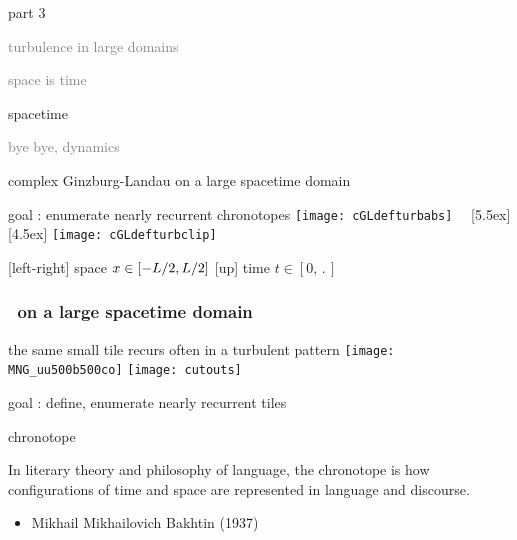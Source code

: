 \begin{frame}{part 3}
\begin{enumerate}
              \item
    \textcolor{gray}{\small
turbulence in large domains
              \item
space is time
    }
              \item {\Large
spacetime
    }\textcolor{gray}{\small
              \item
bye bye, dynamics
                    }
            \end{enumerate}
\end{frame}

\begin{frame}{complex Ginzburg-Landau on a large spacetime domain}
\begin{block}{goal : enumerate nearly recurrent chronotopes}
  \texttt{[image: cGLdefturbabs]}%
~~\raisebox{+3.33ex}[5.5ex][4.5ex]
		 {\texttt{[image: cGLdefturbclip]}}
\end{block}

{\footnotesize
[left-right] space $x \in [-L/2,L/2]$
\qquad
{[up]} time $t\in [0,\period{}]$
}
\end{frame}

\begin{frame}
    \frametitle{\KS\ on a large spacetime domain}
\begin{block}{the same small tile recurs often in a turbulent pattern}
\texttt{[image: MNG\_uu500b500co]}
\texttt{[image: cutouts]}
\end{block}
goal : define, enumerate nearly recurrent tiles
\end{frame}

\begin{frame}{chronotope
}
\begin{bartlett}{
In literary theory and philosophy of language, the chronotope is how
configurations of time and space are represented in language and
discourse.
                }
\end{bartlett}

\bigskip
\bigskip

\begin{itemize}
  \item Mikhail Mikhailovich Bakhtin (1937)
\end{itemize}
\end{frame}

